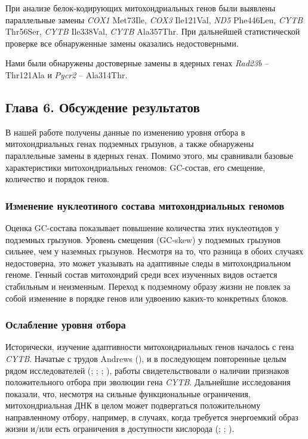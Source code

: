При анализе белок-кодирующих митохондриальных генов были выявлены параллельные замены \textit{COX1} Met73Ile, \textit{COX3} Ile121Val, \textit{ND5} Phe446Leu, \textit{CYTB} Thr56Ser, \textit{CYTB} Ile338Val, \textit{CYTB} Ala357Thr. При дальнейшей статистической проверке все обнаруженные замены оказались недостоверными. 

Нами были обнаружены достоверные замены в ядерных генах \textit{Rad23b} -- Thr121Ala и \textit{Pycr2} -- Ala314Thr.


\subsection*{Глава 6. Обсуждение результатов}

В нашей работе получены данные по изменению уровня отбора в митохондриальных генах подземных грызунов, а также обнаружены параллельные замены в ядерных генах. Помимо этого, мы сравнивали базовые характеристики митохондриальных геномов: GC-состав, его смещение, количество и порядок генов. 

\subsubsection*{Изменение нуклеотиного состава митохондриальных геномов}
Оценка GC-состава показывает повышение количества этих нуклеотидов у подземных грызунов. Уровень смещения (GC-skew) у подземных грызунов сильнее, чем у наземных грызунов. Несмотря на то, что разница в обоих случаях недостоверна, это может указывать на адаптивные следы в митохондриальном геноме. Генный состав митохондрий среди всех изученных видов остается стабильным и неизменным. Переход к подземному образу жизни не повлек за собой изменение в порядке генов или удвоению каких-то конкретных блоков.


\subsubsection*{Ослабление уровня отбора}
Исторически, изучение адаптивности митохондриальных генов началось с гена \textit{CYTB}. Начатые с трудов Andrews (\cite{Andrews1998}), и в последующем повторенные целым рядом исследователей (\cite{Tomasco2014}; \cite{DaSilva2009}; \cite{DiRocco2006}; \cite{Shao2015}), работы свидетельствовали о наличии признаков положительного отбора при эволюции гена \textit{CYTB}. Дальнейшие исследования показали, что, несмотря на сильные функциональные ограничения, митохондриальная ДНК в целом может подвергаться положительному направленному отбору, например, в случаях, когда требуется энергоемкий образ жизни и/или есть ограничения в доступности кислорода (\cite{Tomasco2011}; \cite{Shen2010}; \cite{Blier2001}).


